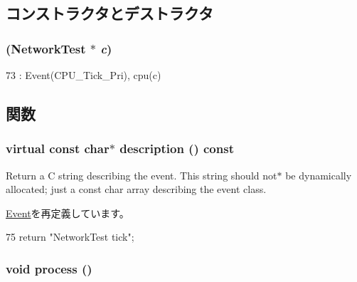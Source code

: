 \subsection{コンストラクタとデストラクタ}
\hypertarget{classNetworkTest_1_1TickEvent_af46127e855fadb2a94134f8d2cc97339}{
\subsubsection[{TickEvent}]{ ({\bf NetworkTest} $\ast$ {\em c})}}
\label{classNetworkTest_1_1TickEvent_af46127e855fadb2a94134f8d2cc97339}



\begin{DoxyCode}
73 : Event(CPU_Tick_Pri), cpu(c) {}
\end{DoxyCode}


\subsection{関数}
\hypertarget{classNetworkTest_1_1TickEvent_a130ddddf003422b413e2e891b1b80e8f}{
\subsubsection[{description}]{\setlength{\rightskip}{0pt plus 5cm}virtual const char$\ast$ description () const}}
\label{classNetworkTest_1_1TickEvent_a130ddddf003422b413e2e891b1b80e8f}
Return a C string describing the event. This string should not$\ast$ be dynamically allocated; just a const char array describing the event class. 

\hyperlink{classEvent_a130ddddf003422b413e2e891b1b80e8f}{Event}を再定義しています。


\begin{DoxyCode}
75 { return "NetworkTest tick"; }
\end{DoxyCode}
\hypertarget{classNetworkTest_1_1TickEvent_a2e9c5136d19b1a95fc427e0852deab5c}{
\subsubsection[{process}]{\setlength{\rightskip}{0pt plus 5cm}void process ()}}
\label{classNetworkTest_1_1TickEvent_a2e9c5136d19b1a95fc427e0852deab5c}


